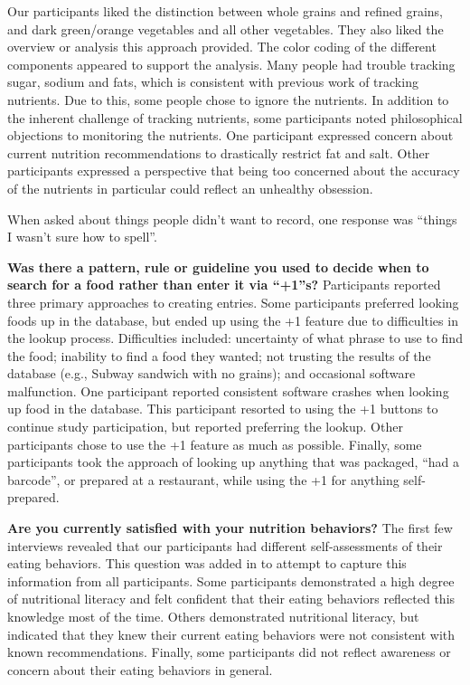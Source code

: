 Our participants liked the distinction between whole grains and refined grains, and dark green/orange vegetables and all other vegetables. They also liked the overview or analysis this approach provided. The color coding of the different components appeared to support the analysis. Many people had trouble tracking sugar, sodium and fats, which is consistent with previous work of tracking nutrients. Due to this, some people chose to ignore the nutrients. In addition to the inherent challenge of tracking nutrients, some participants noted philosophical objections to monitoring the nutrients. One participant expressed concern about current nutrition recommendations to drastically restrict fat and salt. Other participants expressed a perspective that being too concerned about the accuracy of the nutrients in particular could reflect an unhealthy obsession. 

When asked about things people didn't want to record, one response was ``things I wasn't sure how to spell''. 

\textbf{Was there a pattern, rule or guideline you used to decide when to search for a food rather than enter it via ``+1''s? }
Participants reported three primary approaches to creating entries. Some participants preferred looking foods up in the database, but ended up using the +1 feature due to difficulties  in the lookup process. Difficulties included: uncertainty of what phrase to use to find the food; inability to find a food they wanted; not trusting the results of the database (e.g., Subway sandwich with no grains); and occasional software malfunction. One participant reported consistent software crashes when looking up food in the database. This participant resorted to using the +1 buttons to continue study participation, but reported preferring the lookup. Other participants chose to use the +1 feature as much as possible. Finally, some participants took the approach of looking up anything that was packaged, ``had a barcode'', or prepared at a restaurant, while using the +1 for anything self-prepared. 

\textbf{Are you currently satisfied with your nutrition behaviors?}
The first few interviews revealed that our participants had different self-assessments of their eating behaviors. This question was added in to attempt to capture this information from all participants. Some participants demonstrated a high degree of nutritional literacy and felt confident that their eating behaviors reflected this knowledge most of the time. Others demonstrated nutritional literacy, but indicated that they knew their current eating behaviors were not consistent with known recommendations. Finally, some participants did not reflect awareness or concern about their eating behaviors in general. 

